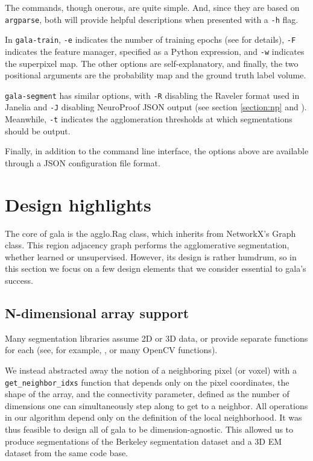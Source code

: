 \documentclass{frontiersSCNS} %
\begin{document}
The commands, though onerous, are quite simple.
And, since they are based on \texttt{\small argparse}, both will provide helpful descriptions when presented with a \texttt{\small -h} flag.

In \texttt{\small gala-train}, \texttt{\small -e} indicates the number of training epochs (see \cite{NunezIglesias:2013cd} for details), \texttt{\small -F} indicates the feature manager, specified as a Python expression, and \texttt{\small -w} indicates the superpixel map.
The other options are self-explanatory, and finally, the two positional arguments are the probability map and the ground truth label volume.

\texttt{\small gala-segment} has similar options, with \texttt{\small -R} disabling the Raveler format \citep{raveler} used in Janelia and \texttt{\small -J} disabling NeuroProof JSON output (see section \ref{section:np} and \cite{np}).
Meanwhile, \texttt{\small -t} indicates the agglomeration thresholds at which segmentations should be output.

Finally, in addition to the command line interface, the options above are available through a JSON configuration file format.


\section{Design highlights}

The core of gala is the agglo.Rag class, which inherits from NetworkX's Graph class.
This region adjacency graph performs the agglomerative segmentation, whether learned or unsupervised.
However, its design is rather humdrum, so in this section we focus on a few design elements that we consider essential to gala's success.

\subsection{N-dimensional array support}

Many segmentation libraries assume 2D or 3D data, or provide separate functions for each (see, for example, \cite{slic-website}, or many OpenCV functions).

We instead abstracted away the notion of a neighboring pixel (or voxel) with a \texttt{\small get\_neighbor\_idxs} function that depends only on the pixel coordinates, the shape of the array, and the connectivity parameter, defined as the number of dimensions one can simultaneously step along to get to a neighbor.
All operations in our algorithm depend only on the definition of the local neighborhood. 
It was thus feasible to design all of gala to be dimension-agnostic.
This allowed us to produce segmentations of the Berkeley segmentation dataset \citep{MartinFTM01} and a 3D EM dataset from the same code base.
\end{document}
